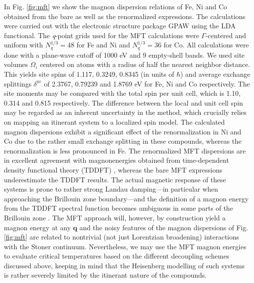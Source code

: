 \documentclass[aps,prb,reprint,floatfix,superscriptaddress]{revtex4-2}
\begin{document}
In Fig. \ref{fig:mft} we show the magnon dispersion relations of Fe, Ni and Co obtained from the bare as well as the renormalized expressions. The calculations were carried out with the electronic structure package GPAW \cite{Mortensen2024} using the LDA functional. The \textit{q}-point grids used for the MFT calculations were $\Gamma$-centered and uniform with $N_q^{1/3}=48$ for Fe and Ni and $N_q^{1/3}=36$ for Co. All calculations were done with a plane-wave cutoff of 1000 eV and 9 empty-shell bands. We used site volumes $\Omega_i$ centered on atoms with a radius of half the nearest neighbor distance. This yields site spins of 1.117, 0.3249, 0.8345 (in units of $\hbar$) and average exchange splittings $\delta^\mathrm{xc}$ of 2.3767, 0.79239 and 1.8769 eV for Fe, Ni and Co respectively. The site moments may be compared with the total spin per unit cell, which is 1.10, 0.314 and 0.815 respectively. The difference between the local and unit cell spin may be regarded as an inherent uncertainty in the method, which crucially relies on mapping an itinerant system to a localized spin model. The calculated magnon dispersions exhibit a significant effect of the renormalization in Ni and Co due to the rather small exchange splitting in these compounds, whereas the renormalization is less pronounced in Fe. The renormalized MFT dispersions are in excellent agreement with magnonenergies obtained from time-dependent density functional theory (TDDFT) \cite{Skovhus2021}, whereas the bare MFT expressions underestimate the TDDFT results. The actual magnetic response of these systems is prone to rather strong Landau damping---in particular when approaching the Brillouin zone boundary---and the definition of a magnon energy from the TDDFT spectral function becomes ambiguous in some parts of the Brillouin zone \cite{Skovhus2021}. The MFT approach will, however, by construction yield a magnon energy at any $\mathbf{q}$ and the noisy features of the magnon dispersions of Fig. \ref{fig:mft} are related to nontrivial (not just Lorentzian broadening) interactions with the Stoner continuum. Nevertheless, we may use the MFT magnon energies to evaluate critical temperatures based on the different decoupling schemes discussed above, keeping in mind that the Heisenberg modelling of such systems is rather severely limited by the itinerant nature of the compounds.
\end{document}
